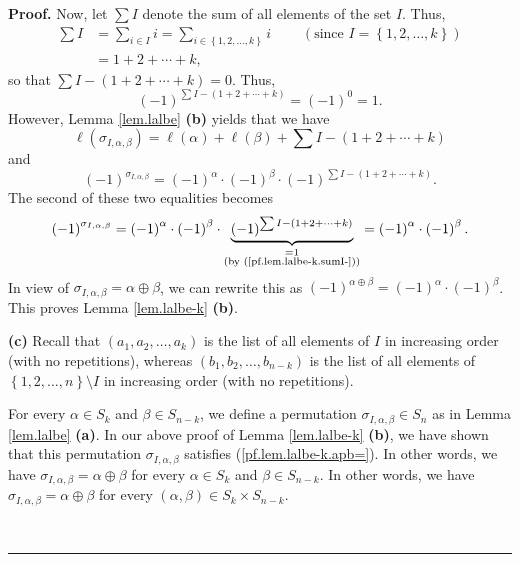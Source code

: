 \documentclass[numbers=enddot,12pt,final,onecolumn,notitlepage,english]{scrartcl}%
\theoremstyle{definition}
\newenvironment{proof}[1][Proof]{\noindent\textbf{#1.} }{\ \rule{0.5em}{0.5em}}
\let\sumnonlimits\sum
\renewcommand{\sum}{\sumnonlimits\limits}
\newenvironment{verlong}{}{}
\begin{document}
\begin{verlong}
\begin{proof}
Now, let $\sum I$ denote the sum of all elements of the set $I$. Thus,
\begin{align*}
\sum I  &  =\sum_{i\in I}i=\sum_{i\in\left\{  1,2,\ldots,k\right\}
}i\ \ \ \ \ \ \ \ \ \ \left(  \text{since }I=\left\{  1,2,\ldots,k\right\}
\right) \\
&  =1+2+\cdots+k,
\end{align*}
so that $\sum I-\left(  1+2+\cdots+k\right)  =0$. Thus,
\begin{equation}
\left(  -1\right)  ^{\sum I-\left(  1+2+\cdots+k\right)  }=\left(  -1\right)
^{0}=1. \label{pf.lem.lalbe-k.sumI-}%
\end{equation}
However, Lemma \ref{lem.lalbe} \textbf{(b)} yields that we have
\[
\ell\left(  \sigma_{I,\alpha,\beta}\right)  =\ell\left(  \alpha\right)
+\ell\left(  \beta\right)  +\sum I-\left(  1+2+\cdots+k\right)
\]
and%
\[
\left(  -1\right)  ^{\sigma_{I,\alpha,\beta}}=\left(  -1\right)  ^{\alpha
}\cdot\left(  -1\right)  ^{\beta}\cdot\left(  -1\right)  ^{\sum I-\left(
1+2+\cdots+k\right)  }.
\]
The second of these two equalities becomes%
\[
\left(  -1\right)  ^{\sigma_{I,\alpha,\beta}}=\left(  -1\right)  ^{\alpha
}\cdot\left(  -1\right)  ^{\beta}\cdot\underbrace{\left(  -1\right)  ^{\sum
I-\left(  1+2+\cdots+k\right)  }}_{\substack{=1\\\text{(by
(\ref{pf.lem.lalbe-k.sumI-}))}}}=\left(  -1\right)  ^{\alpha}\cdot\left(
-1\right)  ^{\beta}.
\]
In view of $\sigma_{I,\alpha,\beta}=\alpha\oplus\beta$, we can rewrite this as
$\left(  -1\right)  ^{\alpha\oplus\beta}=\left(  -1\right)  ^{\alpha}%
\cdot\left(  -1\right)  ^{\beta}$. This proves Lemma \ref{lem.lalbe-k}
\textbf{(b)}. \medskip

\textbf{(c)} Recall that $\left(  a_{1},a_{2},\ldots,a_{k}\right)  $ is the
list of all elements of $I$ in increasing order (with no repetitions), whereas
$\left(  b_{1},b_{2},\ldots,b_{n-k}\right)  $ is the list of all elements of
$\left\{  1,2,\ldots,n\right\}  \setminus I$ in increasing order (with no repetitions).

For every $\alpha\in S_{k}$ and $\beta\in S_{n-k}$, we define a permutation
$\sigma_{I,\alpha,\beta}\in S_{n}$ as in Lemma \ref{lem.lalbe} \textbf{(a)}.
In our above proof of Lemma \ref{lem.lalbe-k} \textbf{(b)}, we have shown that
this permutation $\sigma_{I,\alpha,\beta}$ satisfies
(\ref{pf.lem.lalbe-k.apb=}). In other words, we have $\sigma_{I,\alpha,\beta
}=\alpha\oplus\beta$ for every $\alpha\in S_{k}$ and $\beta\in S_{n-k}$. In
other words, we have $\sigma_{I,\alpha,\beta}=\alpha\oplus\beta$ for every
$\left(  \alpha,\beta\right)  \in S_{k}\times S_{n-k}$.


\end{proof}
\end{verlong}
\end{document}

